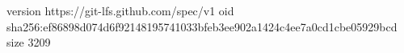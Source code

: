 version https://git-lfs.github.com/spec/v1
oid sha256:ef86898d074d6f92148195741033bfeb3ee902a1424c4ee7a0cd1cbe05929bcd
size 3209
